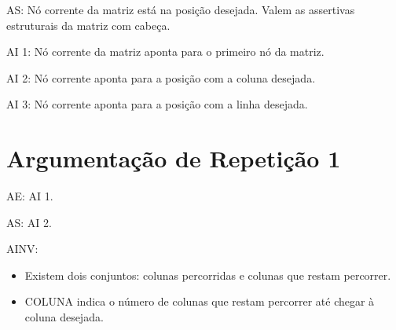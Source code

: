 \documentclass[a4paper,12pt,oneside]{book}
\begin{document}
AS: Nó corrente da matriz está na posição desejada. Valem as assertivas estruturais da matriz com cabeça.

AI 1: Nó corrente da matriz aponta para o primeiro nó da matriz.

AI 2: Nó corrente aponta para a posição com a coluna desejada.

AI 3: Nó corrente aponta para a posição com a linha desejada.

\chapter{Argumentação de Repetição 1}

AE: AI 1.

AS: AI 2.

AINV:

\begin{itemize}

    \item Existem dois conjuntos: colunas percorridas e colunas que restam percorrer.
    \item COLUNA indica o número de colunas que restam percorrer até chegar à coluna desejada.

\end{itemize}
\end{document}
